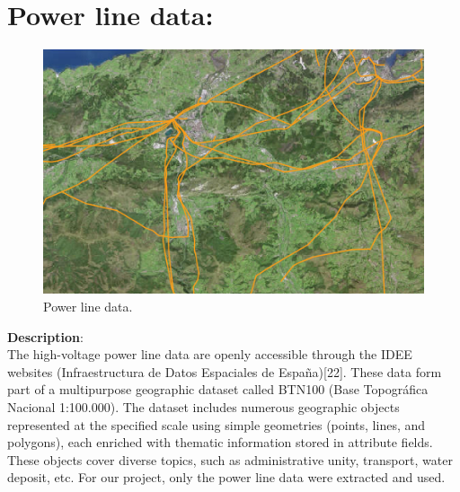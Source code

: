 \section{Power line data: }
\begin{figure}[H]
 \centering
 \includegraphics[scale=1.6]{IMAGENES/IMG15-Lines.png}
 \captionsetup{font=large}
 \caption {Power line data.}
\end{figure}

\textbf{Description}: 
\\
The high-voltage power line data are openly accessible through the IDEE websites (Infraestructura de Datos Espaciales de España)[22]. These data form part of a multipurpose geographic dataset called BTN100 (Base Topográfica Nacional 1:100.000). The dataset includes numerous geographic objects represented at the specified scale using simple geometries (points, lines, and polygons), each enriched with thematic information stored in attribute fields. These objects cover diverse topics, such as administrative unity, transport, water deposit, etc. For our project, only the power line data were extracted and used. 

\clearpage


